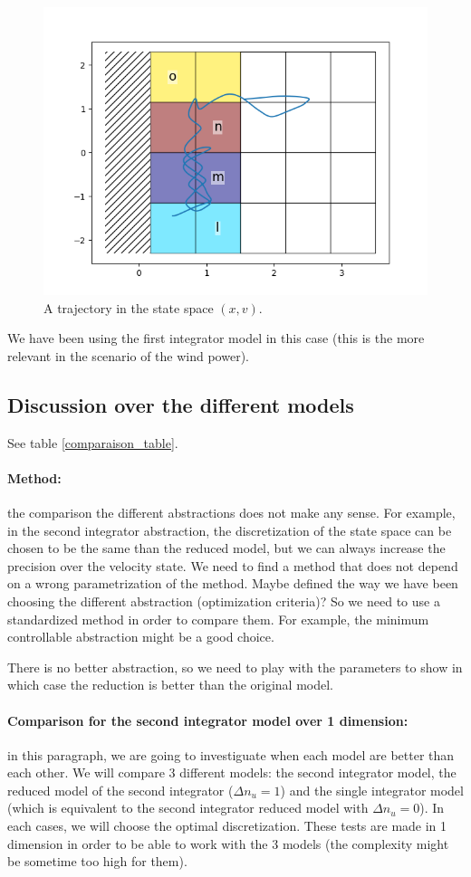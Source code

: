 \documentclass{article}
\theoremstyle{named}
\begin{document}
\begin{figure}[!ht]
  \centering
  \includegraphics[width=0.9\linewidth]{real_case_scenarios}
  \caption{A trajectory in the state space $(x,v)$.}
\end{figure}

We have been using the first integrator model in this case (this is the more relevant in the scenario of the wind power).

\subsection{Discussion over the different models}
See table \ref{comparaison_table}.

\paragraph{Method:}
the comparison the different abstractions does not make any sense.
For example, in the second integrator abstraction, the discretization of the state space can be chosen to be the same than the reduced model, but we can always increase the precision over the velocity state.
We need to find a method that does not depend on a wrong parametrization of the method. Maybe defined the way we have been choosing the different abstraction (optimization criteria)?
So we need to use a standardized method in order to compare them.
For example, the minimum controllable abstraction might be a good choice.

There is no better abstraction, so we need to play with the parameters to show in which case the reduction is better than the original model.


\paragraph{Comparison for the second integrator model over 1 dimension:} in this paragraph, we are going to investiguate when each model are better than each other.
We will compare 3 different models:
the second integrator model,
the reduced model of the second integrator ($\Delta n_u = 1$)
and the single integrator model (which is equivalent to the second integrator reduced model with $\Delta n_u = 0$).
In each cases, we will choose the optimal discretization. These tests are made in 1 dimension in order to be able to work with the 3 models (the complexity might be sometime too high for them).
\end{document}
